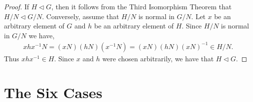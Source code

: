 \begin{proof} If $H \vartriangleleft G$, then it follows from the Third Isomorphism Theorem that $ H / N \vartriangleleft G / N$. Conversely, assume that $H / N$ is normal in $G / N$. Let $x$ be an arbitrary element of $G$ and $h$ be an arbitrary element of $H$. Since $H / N$ is normal in $G / N$ we have,
\begin{align*} x h x^{-1}N = (xN)(hN)(x^{-1}N) = (xN)(hN)(xN)^{-1} \in H / N.
\end{align*}
Thus $x h x^{-1} \in H$. Since $x$ and $h$ were chosen arbitrarily, we have that $H \vartriangleleft G$.

\end{proof}

\section {The Six Cases}

